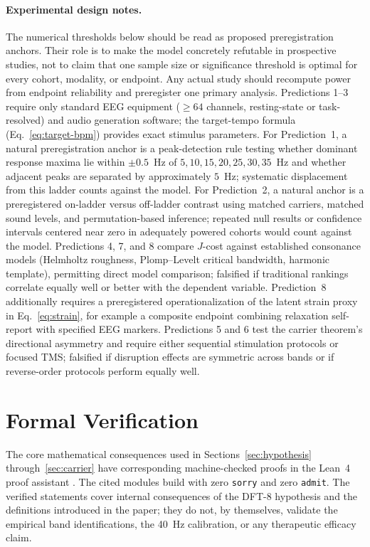 \documentclass[11pt,a4paper]{article}
\begin{document}
\paragraph{Experimental design notes.}
The numerical thresholds below should be read as proposed
preregistration anchors. Their role is to make the model concretely
refutable in prospective studies, not to claim that one sample size or
significance threshold is optimal for every cohort, modality, or
endpoint. Any actual study should recompute power from endpoint
reliability and preregister one primary analysis.
Predictions 1--3 require only standard EEG equipment ($\ge 64$
channels, resting-state or task-resolved) and audio generation
software; the target-tempo formula (Eq.~\ref{eq:target-bpm})
provides exact stimulus parameters.
For Prediction~1, a natural preregistration anchor is a peak-detection
rule testing whether dominant response maxima lie within $\pm 0.5$~Hz
of $5,10,15,20,25,30,35$~Hz and whether adjacent peaks are separated by
approximately $5$~Hz; systematic displacement from this ladder counts
against the model.
For Prediction~2, a natural anchor is a preregistered on-ladder versus
off-ladder contrast using matched carriers, matched sound levels, and
permutation-based inference; repeated null results or confidence
intervals centered near zero in adequately powered cohorts would count
against the model.
Predictions 4, 7, and 8 compare $J$-cost against established
consonance models (Helmholtz roughness, Plomp--Levelt critical
bandwidth, harmonic template), permitting direct model comparison;
falsified if traditional rankings correlate equally well or better
with the dependent variable. Prediction~8 additionally requires a
preregistered operationalization of the latent strain proxy in
Eq.~\ref{eq:strain}, for example a composite endpoint combining
relaxation self-report with specified EEG markers.
Predictions 5 and 6 test the carrier theorem's directional
asymmetry and require either sequential stimulation protocols or
focused TMS; falsified if disruption effects are symmetric across
bands or if reverse-order protocols perform equally well.

\section{Formal Verification}
\label{sec:verification}

The core mathematical consequences used in
Sections~\ref{sec:hypothesis} through~\ref{sec:carrier} have
corresponding machine-checked proofs in the Lean~4 proof assistant
\citep{moura2021}. The cited modules build with zero \texttt{sorry} and
zero \texttt{admit}. The verified statements cover internal
consequences of the DFT-8 hypothesis and the definitions introduced in
the paper; they do not, by themselves, validate the empirical band
identifications, the 40~Hz calibration, or any therapeutic efficacy
claim.
\end{document}
